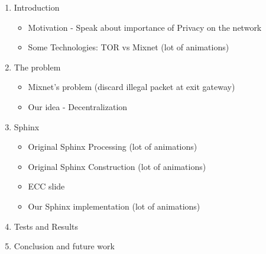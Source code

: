 \begin{frame}
    \begin{enumerate}
        \item Introduction
        \begin{itemize}
            \item Motivation - Speak about importance of Privacy on the network
            \item Some Technologies: TOR vs Mixnet {\color{gray}(lot of animations)}
        \end{itemize}
        \item The problem
        \begin{itemize}
            \item Mixnet's problem (discard illegal packet at exit gateway)
            \item Our idea - Decentralization
        \end{itemize}
        \item Sphinx
        \begin{itemize}
            \item Original Sphinx Processing    {\color{gray}(lot of animations)}
            \item Original Sphinx Construction  {\color{gray}(lot of animations)}       {\color{orange}{(in appendix for conference presentation)}}
            \item ECC slide                                                             {\color{orange}{(in appendix for conference presentation)}}
            \item Our Sphinx implementation     {\color{gray}(lot of animations)}
        \end{itemize}
        \item Tests and Results
        \item Conclusion and future work
    \end{enumerate}
\end{frame}